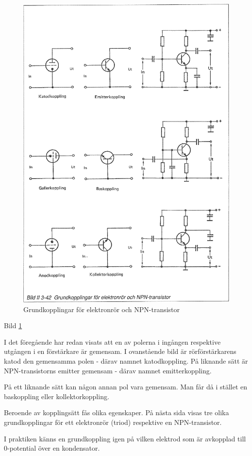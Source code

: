 \begin{figure}
\includegraphics[width=\textwidth]{images/bild_2_3-42}
\caption{Grundkopplingar för elektronrör och NPN-transistor}
\label{fig:BildII3-42}
\end{figure}

Bild \ref{fig:BildII3-42}

\begin{rev-omarbetas}
I det föregående har redan visats att en av polerna i ingången
respektive utgången i en förstärkare är gemensam. I ovanstående bild
är rörförstärkarens katod den gemensamma polen - därav namnet
katodkoppling.  På liknande sätt är NPN-transistorns emitter gemensam
- därav namnet emitterkoppling.

På ett liknande sätt kan någon annan pol vara gemensam. Man får då i
stället en baskoppling eller kollektorkoppling.

Beroende av kopplingsätt fås olika egenskaper. På nästa sida visas tre
olika grundkopplingar för ett elektronrör (triod) respektive en
NPN-transistor.

I praktiken känns en grundkoppling igen på vilken elektrod som är
avkopplad till 0-potential över en kondensator.
\end{rev-omarbetas}

